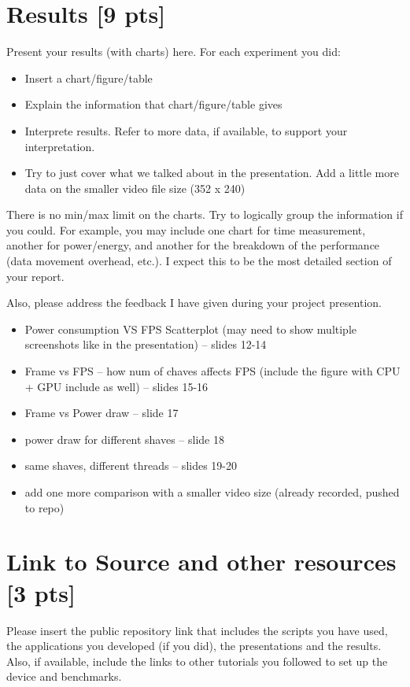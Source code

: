 \documentclass[sigconf,authorversion,nonacm]{acmart}
\begin{document}
\section{Results {\small {[9 pts]}}}  
Present your results (with charts) here. For each experiment you did:
\begin{itemize}
    \item Insert a chart/figure/table 
    \item Explain the information that chart/figure/table gives
    \item Interprete results. Refer to more data, if available, to support your interpretation. 
    \item Try to just cover what we talked about in the presentation. Add a little more data on the smaller video file size (352 x 240)
\end{itemize}

There is no min/max limit on the charts. Try to logically group the information if you could. For example, you may include one chart for time measurement, another for power/energy, and another for the breakdown of the performance (data movement overhead, etc.). I expect this to be the most detailed section of your report.

Also, please address the feedback I have given during your project presention.

\begin{itemize}
    \item Power consumption VS FPS Scatterplot (may need to show multiple screenshots like in the presentation) -- slides 12-14
    \item Frame vs FPS -- how num of chaves affects FPS (include the figure with CPU + GPU include as well) -- slides 15-16
    \item Frame vs Power draw -- slide 17
    \item power draw for different shaves -- slide 18
    \item same shaves, different threads -- slides 19-20
    \item add one more comparison with a smaller video size (already recorded, pushed to repo)
\end{itemize}

\section{Link to Source and other resources {\small {[3 pts]}}} 
Please insert the public repository link that includes the scripts you have used, the applications you developed (if you did), the presentations and the results. Also, if available, include the links to other tutorials you followed to set up the device and benchmarks.
\end{document}
